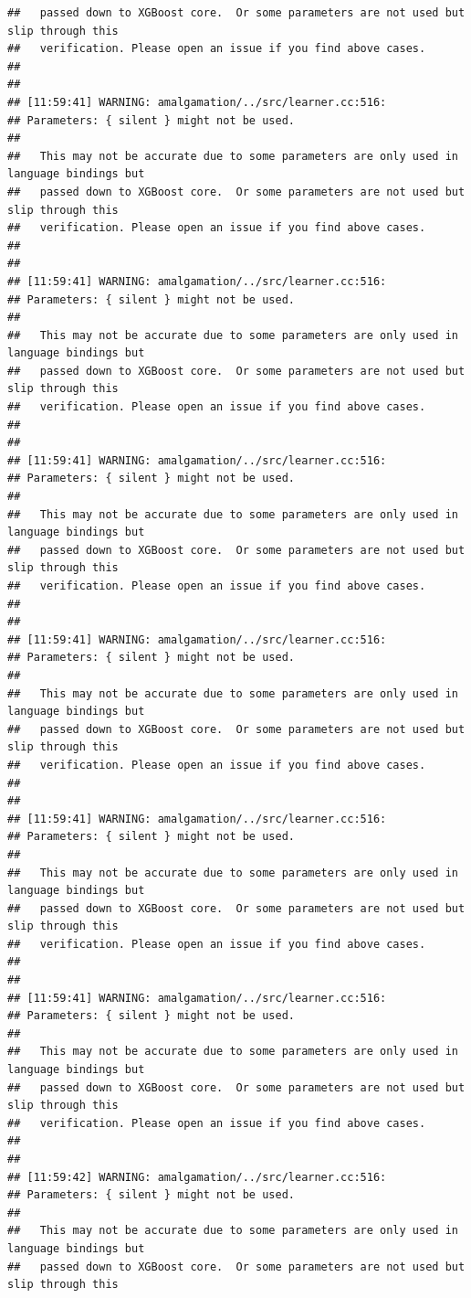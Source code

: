\documentclass[AMS,STIX2COL]{WileyNJD-v2}\usepackage[]{graphicx}\usepackage[]{color}
\makeatletter
\newenvironment{kframe}{%
 \def\at@end@of@kframe{}%
 \ifinner\ifhmode%
  \def\at@end@of@kframe{\end{minipage}}%
  \begin{minipage}{\columnwidth}%
 \fi\fi%
 \def\FrameCommand##1{\hskip\@totalleftmargin \hskip-\fboxsep
 \colorbox{shadecolor}{##1}\hskip-\fboxsep
     \hskip-\linewidth \hskip-\@totalleftmargin \hskip\columnwidth}%
 \MakeFramed {\advance\hsize-\width
   \@totalleftmargin\z@ \linewidth\hsize
   \@setminipage}}%
 {\par\unskip\endMakeFramed%
 \at@end@of@kframe}
\newenvironment{knitrout}{}{} %
\makeatother
\begin{document}
\begin{knitrout}
\begin{kframe}
\begin{verbatim}
##   passed down to XGBoost core.  Or some parameters are not used but slip through this
##   verification. Please open an issue if you find above cases.
## 
## 
## [11:59:41] WARNING: amalgamation/../src/learner.cc:516: 
## Parameters: { silent } might not be used.
## 
##   This may not be accurate due to some parameters are only used in language bindings but
##   passed down to XGBoost core.  Or some parameters are not used but slip through this
##   verification. Please open an issue if you find above cases.
## 
## 
## [11:59:41] WARNING: amalgamation/../src/learner.cc:516: 
## Parameters: { silent } might not be used.
## 
##   This may not be accurate due to some parameters are only used in language bindings but
##   passed down to XGBoost core.  Or some parameters are not used but slip through this
##   verification. Please open an issue if you find above cases.
## 
## 
## [11:59:41] WARNING: amalgamation/../src/learner.cc:516: 
## Parameters: { silent } might not be used.
## 
##   This may not be accurate due to some parameters are only used in language bindings but
##   passed down to XGBoost core.  Or some parameters are not used but slip through this
##   verification. Please open an issue if you find above cases.
## 
## 
## [11:59:41] WARNING: amalgamation/../src/learner.cc:516: 
## Parameters: { silent } might not be used.
## 
##   This may not be accurate due to some parameters are only used in language bindings but
##   passed down to XGBoost core.  Or some parameters are not used but slip through this
##   verification. Please open an issue if you find above cases.
## 
## 
## [11:59:41] WARNING: amalgamation/../src/learner.cc:516: 
## Parameters: { silent } might not be used.
## 
##   This may not be accurate due to some parameters are only used in language bindings but
##   passed down to XGBoost core.  Or some parameters are not used but slip through this
##   verification. Please open an issue if you find above cases.
## 
## 
## [11:59:41] WARNING: amalgamation/../src/learner.cc:516: 
## Parameters: { silent } might not be used.
## 
##   This may not be accurate due to some parameters are only used in language bindings but
##   passed down to XGBoost core.  Or some parameters are not used but slip through this
##   verification. Please open an issue if you find above cases.
## 
## 
## [11:59:42] WARNING: amalgamation/../src/learner.cc:516: 
## Parameters: { silent } might not be used.
## 
##   This may not be accurate due to some parameters are only used in language bindings but
##   passed down to XGBoost core.  Or some parameters are not used but slip through this

\end{verbatim}
\end{kframe}
\end{knitrout}
\end{document}
